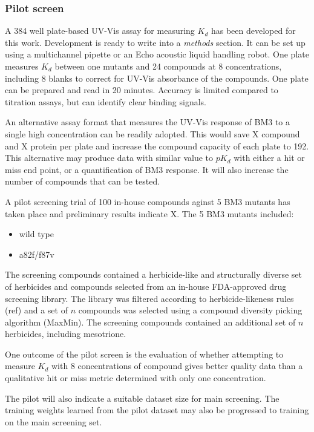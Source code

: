 \documentclass{article}
\begin{document}
\subsubsection{Pilot screen}
A 384 well plate-based UV-Vis assay for measuring $K_d$ has been developed for this work. Development is ready to write into a \textit{methods} section. It can be set up using a multichannel pipette or an Echo acoustic liquid handling robot. One plate measures $K_d$ between one mutants and 24 compounds at 8 concentrations, including 8 blanks to correct for UV-Vis absorbance of the compounds. One plate can be prepared and read in 20 minutes. Accuracy is limited compared to titration assays, but can identify clear binding signals. %
\par
An alternative assay format that measures the UV-Vis response of BM3 to a single high concentration can be readily adopted. This would save X compound and X protein per plate and increase the compound capacity of each plate to 192. %
This alternative may produce data with similar value to $pK_d$ with either a hit or miss end point, or a quantification of BM3 response. It will also increase the number of compounds that can be tested. %
\par
A pilot screening trial of 100 in-house compounds aginst 5 BM3 mutants has taken place and preliminary results indicate X. %
The 5 BM3 mutants included:
\begin{itemize}
	\item wild type
	\item a82f/f87v
\end{itemize}
The screening compounds contained a herbicide-like and structurally diverse set of herbicides and  compounds selected from an in-house FDA-approved drug screening library. The library was filtered according to herbicide-likeness rules (ref) and a set of $n$ compounds was selected using a compound diversity picking algorithm (MaxMin). %
The screening compounds contained an additional set of $n$ herbicides, including mesotrione.
\par
One outcome of the pilot screen is the evaluation of whether attempting to measure $K_d$ with 8 concentrations of compound gives better quality data than a qualitative hit or miss metric determined with only one concentration. %
\par
The pilot will also indicate a suitable dataset size for main screening. The training weights learned from the pilot dataset may also be progressed to training on the main screening set. %
\par
\end{document}
